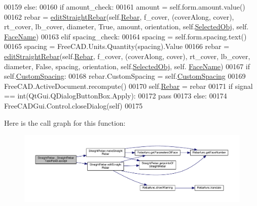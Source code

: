 \begin{DoxyCode}
00159         \textcolor{keywordflow}{else}:
00160             \textcolor{keywordflow}{if} amount\_check:
00161                 amount = self.form.amount.value()
00162                 rebar = \hyperlink{namespaceStraightRebar_ab4c578165b01dd7c7d121e5345de2d7b}{editStraightRebar}(self.\hyperlink{classStraightRebar_1_1__StraightRebarTaskPanel_a23fe17475277eae59cbed538f0f183cb}{Rebar}, f\_cover, (coverAlong, cover), 
      rt\_cover, lb\_cover, diameter, \textcolor{keyword}{True}, amount, orientation, self.\hyperlink{classStraightRebar_1_1__StraightRebarTaskPanel_a4bdbe85e1cc468f34a907db99faebe85}{SelectedObj}, self.
      \hyperlink{classStraightRebar_1_1__StraightRebarTaskPanel_afe733532cc15a149f9ba8f7da4515413}{FaceName})
00163             \textcolor{keywordflow}{elif} spacing\_check:
00164                 spacing = self.form.spacing.text()
00165                 spacing = FreeCAD.Units.Quantity(spacing).Value
00166                 rebar = \hyperlink{namespaceStraightRebar_ab4c578165b01dd7c7d121e5345de2d7b}{editStraightRebar}(self.\hyperlink{classStraightRebar_1_1__StraightRebarTaskPanel_a23fe17475277eae59cbed538f0f183cb}{Rebar}, f\_cover, (coverAlong, cover), 
      rt\_cover, lb\_cover, diameter, \textcolor{keyword}{False}, spacing, orientation, self.\hyperlink{classStraightRebar_1_1__StraightRebarTaskPanel_a4bdbe85e1cc468f34a907db99faebe85}{SelectedObj}, self.
      \hyperlink{classStraightRebar_1_1__StraightRebarTaskPanel_afe733532cc15a149f9ba8f7da4515413}{FaceName})
00167         \textcolor{keywordflow}{if} self.\hyperlink{classStraightRebar_1_1__StraightRebarTaskPanel_a91d60c0007437af93af933a29c66a963}{CustomSpacing}:
00168             rebar.CustomSpacing = self.\hyperlink{classStraightRebar_1_1__StraightRebarTaskPanel_a91d60c0007437af93af933a29c66a963}{CustomSpacing}
00169             FreeCAD.ActiveDocument.recompute()
00170         self.\hyperlink{classStraightRebar_1_1__StraightRebarTaskPanel_a23fe17475277eae59cbed538f0f183cb}{Rebar} = rebar
00171         \textcolor{keywordflow}{if} signal == int(QtGui.QDialogButtonBox.Apply):
00172             \textcolor{keywordflow}{pass}
00173         \textcolor{keywordflow}{else}:
00174             FreeCADGui.Control.closeDialog(self)
00175 
\end{DoxyCode}


Here is the call graph for this function\+:\nopagebreak
\begin{figure}[H]
\begin{center}
\leavevmode
\includegraphics[width=350pt]{classStraightRebar_1_1__StraightRebarTaskPanel_ad8a49d3d30ef3308b8386c9ebe1b67d8_cgraph}
\end{center}
\end{figure}




